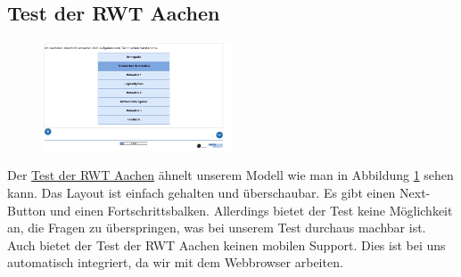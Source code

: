 \subsection{Test der RWT Aachen}
\begin{figure}[htbp] 
  \centering
     \includegraphics[width=0.5\textwidth]{Jonas_Images/abschnitte.png}
  \caption{}
  \label{fig:Bild4}
\end{figure}
Der \href{https://www.global-assess.rwth-aachen.de/rwth/tm_alt/}{Test der RWT Aachen} ähnelt unserem Modell wie man in Abbildung \ref{fig:Bild4} sehen kann. Das Layout ist einfach gehalten und überschaubar. Es gibt einen Next-Button und einen Fortschrittsbalken. Allerdings bietet der Test keine Möglichkeit an, die Fragen zu überspringen, was bei unserem Test durchaus machbar ist. Auch bietet der Test der RWT Aachen keinen mobilen Support. Dies ist bei uns automatisch integriert, da wir mit dem Webbrowser arbeiten.